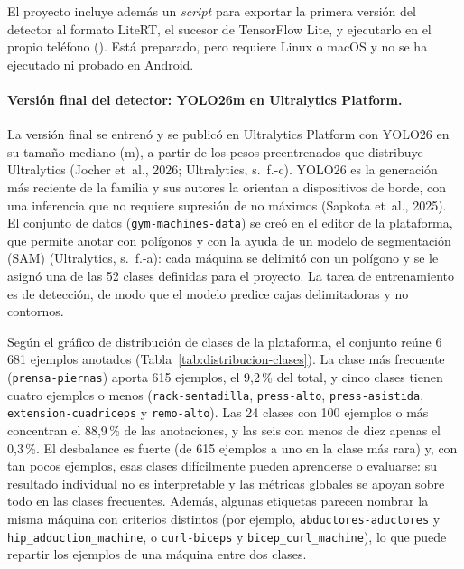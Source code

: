El proyecto incluye además un \emph{script} para exportar la primera versión del detector al formato
LiteRT, el sucesor de TensorFlow Lite, y ejecutarlo en el propio teléfono
(). Está preparado, pero requiere Linux o macOS y no
se ha ejecutado ni probado en Android.

\paragraph{Versión final del detector: YOLO26m en Ultralytics Platform.} La versión
final se entrenó y se publicó en Ultralytics Platform con YOLO26 en su tamaño
mediano (m), a partir de los pesos preentrenados que distribuye Ultralytics
(Jocher et~al., 2026; Ultralytics, s.~f.-c). YOLO26 es la generación más reciente
de la familia y sus autores la orientan a dispositivos de borde, con una
inferencia que no requiere supresión de no máximos (Sapkota et~al., 2025). El
conjunto de datos (\texttt{gym-machines-data}) se creó en el editor de la
plataforma, que permite anotar con polígonos y con la ayuda de un modelo de
segmentación (SAM) (Ultralytics, s.~f.-a): cada máquina se delimitó con un
polígono y se le asignó una de las 52 clases definidas para el proyecto. La
tarea de entrenamiento es de detección, de modo que el modelo predice cajas
delimitadoras y no contornos.

Según el gráfico de distribución de clases de la plataforma, el conjunto reúne
6\,681 ejemplos anotados (Tabla~\ref{tab:distribucion-clases}). La clase más
frecuente (\texttt{prensa-piernas}) aporta 615 ejemplos, el 9,2\,\% del total,
y cinco clases tienen cuatro ejemplos o menos (\texttt{rack-sentadilla},
\texttt{press-alto}, \texttt{press-asistida}, \texttt{extension-cuadriceps} y
\texttt{remo-alto}). Las 24 clases con 100 ejemplos o más concentran el
88,9\,\% de las anotaciones, y las seis con menos de diez apenas el 0,3\,\%. El
desbalance es fuerte (de 615 ejemplos a uno en la clase más rara) y, con tan
pocos ejemplos, esas clases difícilmente pueden aprenderse o evaluarse: su
resultado individual no es interpretable y las métricas globales se apoyan
sobre todo en las clases frecuentes. Además, algunas etiquetas parecen nombrar
la misma máquina con criterios distintos (por ejemplo,
\texttt{abductores-aductores} y \texttt{hip\_adduction\_machine}, o
\texttt{curl-biceps} y \texttt{bicep\_curl\_machine}), lo que puede repartir los
ejemplos de una máquina entre dos clases.

